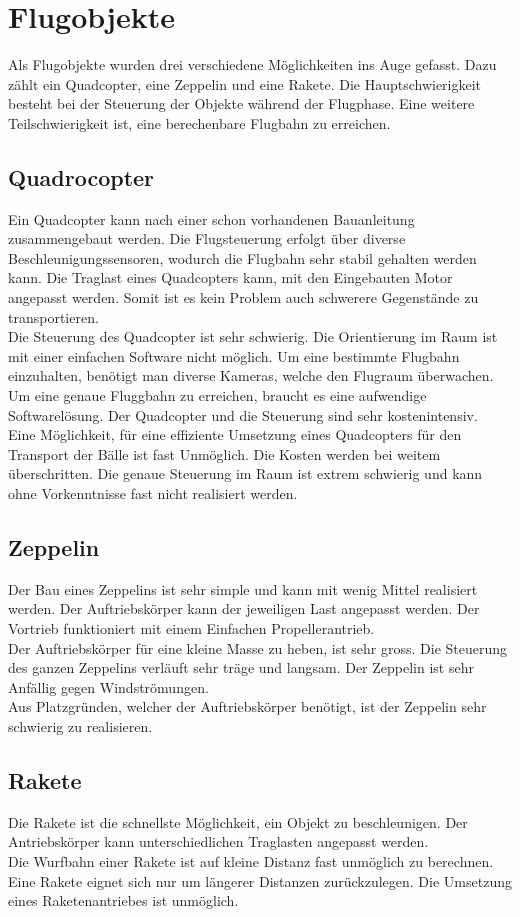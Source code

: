 \section{Flugobjekte}
Als Flugobjekte wurden drei verschiedene Möglichkeiten ins Auge gefasst. Dazu zählt ein Quadcopter, eine Zeppelin und eine Rakete. Die Hauptschwierigkeit besteht bei der Steuerung der Objekte während der Flugphase. Eine weitere Teilschwierigkeit ist, eine berechenbare Flugbahn zu erreichen. 

\subsection{Quadrocopter}
Ein Quadcopter kann nach einer schon vorhandenen Bauanleitung zusammengebaut werden. Die Flugsteuerung erfolgt über diverse Beschleunigungssensoren, wodurch die Flugbahn sehr stabil gehalten werden kann. Die Traglast eines Quadcopters kann, mit den Eingebauten Motor angepasst werden. Somit ist es kein Problem auch schwerere Gegenstände zu transportieren.\\
Die Steuerung des Quadcopter ist sehr schwierig. Die Orientierung im Raum ist mit einer einfachen Software nicht möglich. Um eine bestimmte Flugbahn einzuhalten, benötigt man diverse Kameras, welche den Flugraum überwachen. Um eine genaue Fluggbahn zu erreichen, braucht es eine aufwendige Softwarelösung. Der Quadcopter und die Steuerung sind sehr kostenintensiv.\\
Eine Möglichkeit, für eine effiziente Umsetzung eines Quadcopters für den Transport der Bälle ist fast Unmöglich. Die Kosten werden bei weitem überschritten. Die genaue Steuerung im Raum ist extrem schwierig und kann ohne Vorkenntnisse fast nicht realisiert werden. 


\subsection{Zeppelin}
Der Bau eines Zeppelins ist sehr simple und kann mit wenig Mittel realisiert werden. Der Auftriebskörper kann der jeweiligen Last angepasst werden. Der Vortrieb funktioniert mit einem Einfachen Propellerantrieb. \\
Der Auftriebskörper für eine kleine Masse zu heben, ist sehr gross. Die Steuerung des ganzen Zeppelins verläuft sehr träge und langsam. Der Zeppelin ist sehr Anfällig gegen Windströmungen. \\
Aus Platzgründen, welcher der Auftriebskörper benötigt, ist der Zeppelin sehr schwierig zu realisieren. 

\subsection{Rakete}
Die Rakete ist die schnellste Möglichkeit, ein Objekt zu beschleunigen. Der Antriebskörper kann unterschiedlichen Traglasten angepasst werden.\\
Die Wurfbahn einer Rakete ist auf kleine Distanz fast unmöglich zu berechnen. Eine Rakete eignet sich nur um längerer Distanzen zurückzulegen. Die Umsetzung eines Raketenantriebes ist unmöglich. 
